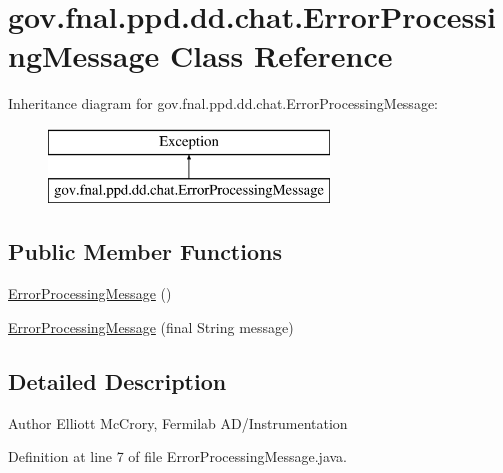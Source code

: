 \hypertarget{classgov_1_1fnal_1_1ppd_1_1dd_1_1chat_1_1ErrorProcessingMessage}{\section{gov.\-fnal.\-ppd.\-dd.\-chat.\-Error\-Processing\-Message Class Reference}
\label{classgov_1_1fnal_1_1ppd_1_1dd_1_1chat_1_1ErrorProcessingMessage}
}
Inheritance diagram for gov.\-fnal.\-ppd.\-dd.\-chat.\-Error\-Processing\-Message\-:\begin{figure}[H]
\begin{center}
\leavevmode
\includegraphics[height=2.000000cm]{classgov_1_1fnal_1_1ppd_1_1dd_1_1chat_1_1ErrorProcessingMessage}
\end{center}
\end{figure}
\subsection*{Public Member Functions}
\begin{DoxyCompactItemize}
\item 
\hyperlink{classgov_1_1fnal_1_1ppd_1_1dd_1_1chat_1_1ErrorProcessingMessage_a60ff9c6809443340f29943a7297d16c0}{Error\-Processing\-Message} ()
\item 
\hyperlink{classgov_1_1fnal_1_1ppd_1_1dd_1_1chat_1_1ErrorProcessingMessage_a8bd09b8af0e6baf740f7e965086b15d8}{Error\-Processing\-Message} (final String message)
\end{DoxyCompactItemize}


\subsection{Detailed Description}
\begin{DoxyAuthor}{Author}
Elliott Mc\-Crory, Fermilab A\-D/\-Instrumentation 
\end{DoxyAuthor}


Definition at line 7 of file Error\-Processing\-Message.\-java.



